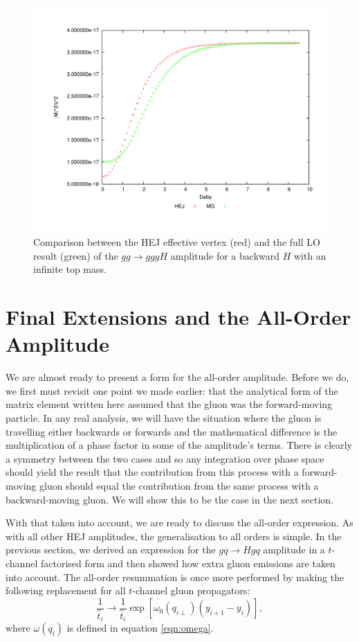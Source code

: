 \begin{figure}[t]
\centering
\includegraphics[scale=0.45]{Images/gg_nextback.pdf}
\caption{Comparison between the HEJ effective vertex (red) and the full LO result (green) of the $gg \to gggH$ amplitude for a backward $H$ with an infinite top mass.}
\label{fig:gg_ggh_4}
\end{figure}

\clearpage

\section{Final Extensions and the All-Order Amplitude}
We are almost ready to present a form for the all-order amplitude. Before we do, we first must revisit one point we made earlier: that the analytical form of the matrix element written here assumed that the gluon was the forward-moving particle. In any real analysis, we will have the situation where the gluon is travelling either backwards or forwards and the mathematical difference is the multiplication of a phase factor in some of the amplitude's terms. There is clearly a symmetry between the two cases and so any integration over phase space should yield the result that the contribution from this process with a forward-moving gluon should equal the contribution from the same process with a backward-moving gluon. We will show this to be the case in the next section. 

With that taken into account, we are ready to discuss the all-order expression. As with all other HEJ amplitudes, the generalisation to all orders is simple. In the previous section, we derived an expression for the $gq \to Hgq$ amplitude in a $t$-channel factorised form and then showed how extra gluon emissions are taken into account. The all-order resummation is once more performed by making the following replacement for all $t$-channel gluon propagators:
\begin{equation}
\frac{1}{\hat{t}_i} \to \frac{1}{\hat{t}_i} \exp \left[ \omega_0(q_{i\perp})(y_{i+1} - y_i) \right],
\end{equation}
where $\omega(q_i)$ is defined in equation \ref{eqn:omega}. 

